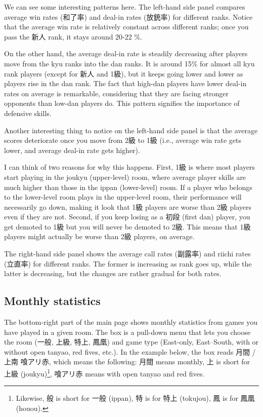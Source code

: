 \bigskip
We can see some interesting patterns here. The left-hand side panel compares average win rates (和了率) and deal-in rates (放銃率) for different ranks. Notice that the average win rate is relatively constant across different ranks; once you pass the 新人 rank, it stays around 20-22 \%.

\bigskip
On the other hand, the average deal-in rate is steadily decreasing after players move from the {\jap kyu} ranks into the {\jap dan} ranks. It is around 15\% for almost all {\jap kyu} rank players (except for 新人 and 1級), but it keeps going lower and lower as players rise in the {\jap dan} rank. The fact that high-{\jap dan} players have lower deal-in rates on average is remarkable, considering that they are facing stronger opponents than low-{\jap dan} players do. This pattern signifies the importance of defensive skills.

\bigskip

Another interesting thing to notice on the left-hand side panel is that the average scores deteriorate once you move from 2級 to 1級 (i.e., average win rate gets lower, and average deal-in rate gets higher).

\bigskip
I can think of two reasons for why this happens. First, 1級 is where most players start playing in the {\jap joukyu} (upper-level) room, where average player skills are much higher than those in the {\jap ippan} (lower-level) room. If a player who belongs to the lower-level room plays in the upper-level room, their performance will necessarily go down, making it look that 1級 players are worse than 2級 players even if they are not. Second, if you keep losing as a 初段 (first {\jap dan}) player, you get demoted to 1級 but you will never be demoted to 2級. This means that 1級 players might actually be worse than 2級 players, on average.

\bigskip

The right-hand side panel shows the average call rates (副露率) and riichi rates (立直率) for different ranks. The former is increasing as rank goes up, while the latter is decreasing, but the changes are rather gradual for both rates.

\vfill

\subsection{Monthly statistics}
The bottom-right part of the main page shows monthly statistics from games you have played in a given room. The box is a pull-down menu that lets you choose the room (一般, 上級, 特上, 鳳凰) and game type (East-only, East--South, with or without open {\jap tanyao}, red fives, etc.). In the example below, the box reads 月間 / 上南 喰アリ赤, which means the following: 月間 means monthly, 上 is short for 上級 ({\jap joukyu})\footnote{Likewise, 般 is short for 一般 ({\jap ippan}), 特 is for 特上 ({\jap tokujou}), 鳳 is for 鳳凰 ({\jap houou}).}, 喰アリ赤 means with open {\jap tanyao} and red fives.

